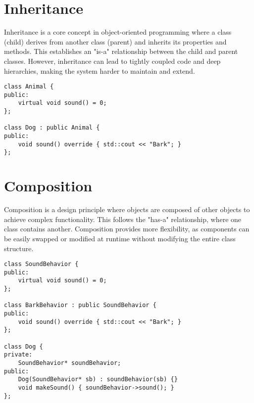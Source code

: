 \documentclass{article}
\begin{document}
\newpage
\section{Inheritance}
Inheritance is a core concept in object-oriented programming where a class (child) derives from another class (parent) and inherits its properties and methods. This establishes an "is-a" relationship between the child and parent classes. However, inheritance can lead to tightly coupled code and deep hierarchies, making the system harder to maintain and extend.

\begin{center}
    \begin{minipage}[c]{0.5\textwidth}
        \begin{verbatim}
class Animal {
public:
    virtual void sound() = 0;
};

class Dog : public Animal {
public:
    void sound() override { std::cout << "Bark"; }
};
        \end{verbatim}
    \end{minipage}
\end{center}

\section{Composition}
Composition is a design principle where objects are composed of other objects to achieve complex functionality. This follows the "has-a" relationship, where one class contains another. Composition provides more flexibility, as components can be easily swapped or modified at runtime without modifying the entire class structure.

\begin{center}
    \begin{minipage}[c]{0.5\textwidth}
        \begin{verbatim}
class SoundBehavior {
public:
    virtual void sound() = 0;
};

class BarkBehavior : public SoundBehavior {
public:
    void sound() override { std::cout << "Bark"; }
};

class Dog {
private:
    SoundBehavior* soundBehavior;
public:
    Dog(SoundBehavior* sb) : soundBehavior(sb) {}
    void makeSound() { soundBehavior->sound(); }
};
        \end{verbatim}
    \end{minipage}
\end{center}
\end{document}
